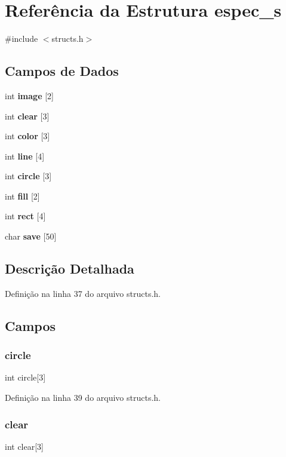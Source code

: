 \section{Referência da Estrutura espec\+\_\+s}
\label{structespec__s}


{\ttfamily \#include $<$structs.\+h$>$}

\subsection*{Campos de Dados}
\begin{DoxyCompactItemize}
\item 
int \textbf{ image} [2]
\item 
int \textbf{ clear} [3]
\item 
int \textbf{ color} [3]
\item 
int \textbf{ line} [4]
\item 
int \textbf{ circle} [3]
\item 
int \textbf{ fill} [2]
\item 
int \textbf{ rect} [4]
\item 
char \textbf{ save} [50]
\end{DoxyCompactItemize}


\subsection{Descrição Detalhada}


Definição na linha 37 do arquivo structs.\+h.



\subsection{Campos}
\mbox{\label{structespec__s_a580dc815def5043f4a0c2ba2904347e1}} 
\subsubsection{circle}
{\footnotesize\ttfamily int circle[3]}



Definição na linha 39 do arquivo structs.\+h.

\mbox{\label{structespec__s_a42780ccbbe56b172c6669abace0cc905}} 
\subsubsection{clear}
{\footnotesize\ttfamily int clear[3]}



